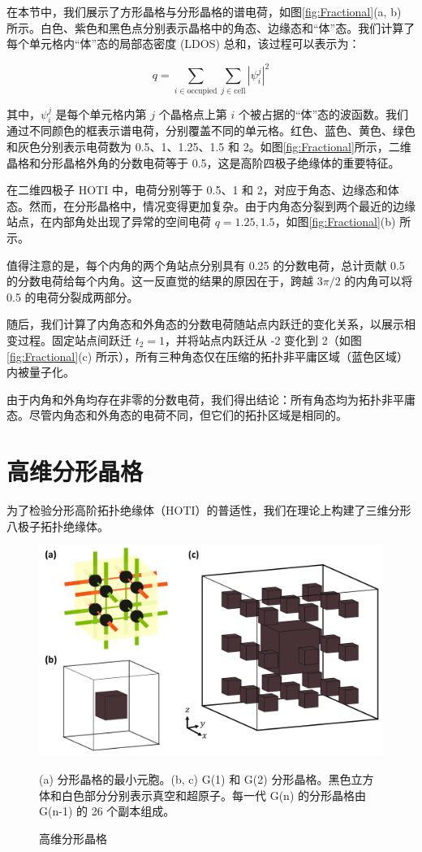 在本节中，我们展示了方形晶格与分形晶格的谱电荷，如图\ref{fig:Fractional}(a, b) 所示。白色、紫色和黑色点分别表示晶格中的角态、边缘态和“体”态。我们计算了每个单元格内“体”态的局部态密度 (LDOS) 总和，该过程可以表示为：

\begin{equation}
q = \sum_{i \in \text{occupied}} \sum_{j \in \text{cell}} |\psi_i^j|^2
\end{equation}

其中，\( \psi_i^j \) 是每个单元格内第 \( j \) 个晶格点上第 \( i \) 个被占据的“体”态的波函数。我们通过不同颜色的框表示谱电荷，分别覆盖不同的单元格。红色、蓝色、黄色、绿色和灰色分别表示电荷数为 0.5、1、1.25、1.5 和 2。如图\ref{fig:Fractional}所示，二维晶格和分形晶格外角的分数电荷等于 0.5，这是高阶四极子绝缘体的重要特征。

在二维四极子 HOTI 中，电荷分别等于 0.5、1 和 2，对应于角态、边缘态和体态。然而，在分形晶格中，情况变得更加复杂。由于内角态分裂到两个最近的边缘站点，在内部角处出现了异常的空间电荷 \( q = 1.25, 1.5 \)，如图\ref{fig:Fractional}(b) 所示。

值得注意的是，每个内角的两个角站点分别具有 0.25 的分数电荷，总计贡献 0.5 的分数电荷给每个内角。这一反直觉的结果的原因在于，跨越 \( 3\pi/2 \) 的内角可以将 0.5 的电荷分裂成两部分。

随后，我们计算了内角态和外角态的分数电荷随站点内跃迁的变化关系，以展示相变过程。固定站点间跃迁 \( t_2 = 1 \)，并将站点内跃迁从 -2 变化到 2（如图 \ref{fig:Fractional}(c) 所示），所有三种角态仅在压缩的拓扑非平庸区域（蓝色区域）内被量子化。

由于内角和外角均存在非零的分数电荷，我们得出结论：所有角态均为拓扑非平庸态。尽管内角态和外角态的电荷不同，但它们的拓扑区域是相同的。

\section{高维分形晶格}
为了检验分形高阶拓扑绝缘体（HOTI）的普适性，我们在理论上构建了三维分形八极子拓扑绝缘体。

\begin{figure}[htbp]
    \centering
    \includegraphics[width=0.5\linewidth]{figure/HOTITheo/3DLattice.png}
    \caption{高维分形晶格}(a) 分形晶格的最小元胞。(b, c) G(1) 和 G(2) 分形晶格。黑色立方体和白色部分分别表示真空和超原子。每一代 G(n) 的分形晶格由 G(n-1) 的 26 个副本组成。
    \label{fig:3DLattice}
\end{figure}

